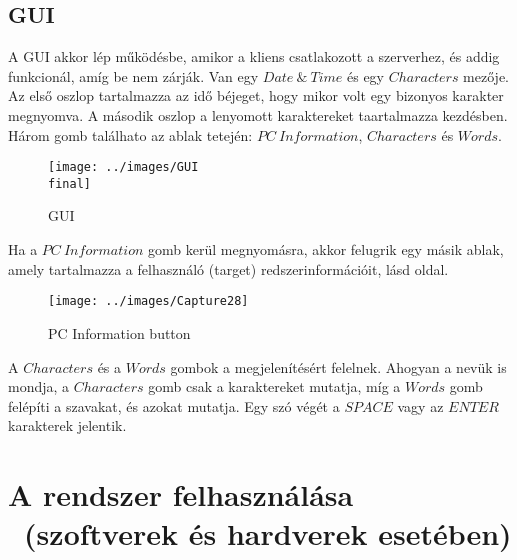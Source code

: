 \documentclass[a4paper, 11pt]{article}
\begin{document}
\subsection{GUI}\label{subsec:gui}
A GUI akkor lép működésbe, amikor a kliens csatlakozott a szerverhez, és addig funkcionál, amíg be nem zárják. Van egy $Date\ \&\ Time$ és egy $Characters$ mezője. Az első oszlop tartalmazza az idő béjeget, hogy mikor volt egy bizonyos karakter megnyomva. A második oszlop a lenyomott karaktereket taartalmazza kezdésben. Három gomb találhato az ablak tetején: $PC\ Information$, $Characters$ és $Words$.
\begin{figure}[H]
\centering
\texttt{[image: ../images/GUI\\ final]}
\caption{GUI}
\label{fig:gui}
\end{figure}
Ha a $PC\ Information$ gomb kerül megnyomásra, akkor felugrik egy másik ablak, amely tartalmazza a felhasználó (target) redszerinformációit, lásd \pageref{subsubsec:keyloggerclientclass} oldal.
\begin{figure}[H]
\centering
\texttt{[image: ../images/Capture28]}
\caption{PC Information button}
\label{fig:pcinfo}
\end{figure}
A $Characters$ és a $Words$ gombok a megjelenítésért felelnek. Ahogyan a nevük is mondja, a $Characters$ gomb csak a karaktereket mutatja, míg a $Words$ gomb felépíti a szavakat, és azokat mutatja. Egy szó végét a $SPACE$ vagy az $ENTER$ karakterek jelentik.


\section{A rendszer felhasználása \ (szoftverek és hardverek esetében)}\label{sec:useage}
\end{document}
